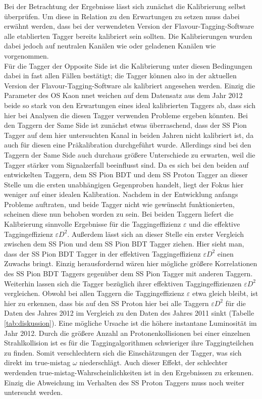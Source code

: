 Bei der Betrachtung der Ergebnisse lässt sich zunächst die Kalibrierung selbst überprüfen. Um diese in Relation zu den Erwartungen zu setzen muss dabei erwähnt werden, dass bei der verwendeten Version der Flavour-Tagging-Software alle etablierten Tagger bereits kalibriert sein sollten. Die Kalibrierungen wurden dabei jedoch auf neutralen Kanälen wie \BdToJPsiKst oder geladenen Kanälen wie \BuToJPsiKp vorgenommen.\\
Für die Tagger der Opposite Side ist die Kalibrierung unter diesen Bedingungen dabei in fast allen Fällen bestätigt; die Tagger können also in der aktuellen Version der Flavour-Tagging-Software als kalibriert angesehen werden. Einzig die Parameter des OS Kaon nnet weichen auf dem Datensatz aus dem Jahr \num{2012} beide so stark von den Erwartungen eines ideal kalibrierten Taggers ab, dass sich hier bei Analysen die diesen Tagger verwenden Probleme ergeben könnten. Bei den Taggern der Same Side ist zunächst etwas überraschend, dass der SS Pion Tagger auf dem hier untersuchten Kanal in beiden Jahren nicht kalibriert ist, da auch für diesen eine Präkalibration durchgeführt wurde. Allerdings sind bei den Taggern der Same Side auch durchaus größere Unterschiede zu erwarten, weil die Tagger stärker vom Signalzerfall beeinflusst sind. Da es sich bei den beiden auf \BdToDpi entwickelten Taggern, dem SS Pion BDT und dem SS Proton Tagger an dieser Stelle um die ersten unabhängigen Gegenproben handelt, liegt der Fokus hier weniger auf einer idealen Kalibration. Nachdem in der Entwicklung anfangs Probleme auftraten, und beide Tagger nicht wie gewünscht funktionierten, scheinen diese nun behoben worden zu sein. Bei beiden Taggern liefert die Kalibrierung sinnvolle Ergebnisse für die Taggingeffizienz $\varepsilon$ und die effektive Taggingeffizienz $\varepsilon D^2$. Außerdem lässt sich an dieser Stelle ein erster Vergleich zwischen dem SS Pion und dem SS Pion BDT Tagger ziehen. Hier sieht man, dass der SS Pion BDT Tagger in der effektiven Taggingeffizienz $\varepsilon D^2$ einen Zuwachs bringt. Einzig herausfordernd wären hier mögliche größere Korrelationen des SS Pion BDT Taggers gegenüber dem SS Pion Tagger mit anderen Taggern.\\
Weiterhin lassen sich die Tagger bezüglich ihrer effektiven Taggingeffizienzen $\varepsilon D^2$ vergleichen. Obwohl bei allen Taggern die Taggingeffizienz $\varepsilon$ etwa gleich bleibt, ist hier zu erkennen, dass bis auf den SS Proton hier bei alle Taggern  $\varepsilon D^2$ für die Daten des Jahres \num{2012} im Vergleich zu den Daten des Jahres \num{2011} sinkt (Tabelle \ref{tab:diskussion}). Eine mögliche Ursache ist die höhere instantane Luminosität im Jahr \num{2012}. Durch die größere Anzahl an Protonenkollisionen bei einer einzelnen Strahlkollision ist es für die Taggingalgorithmen schwieriger ihre Taggingteilchen zu finden. Somit verschlechtern sich die Einschätzungen der Tagger, was sich direkt im true-mistag $\omega$ niederschlägt. Auch dieser Effekt, der schlechter werdenden true-mistag-Wahrscheinlichkeiten ist in den Ergebnissen zu erkennen. Einzig die Abweichung im Verhalten des SS Proton Taggers muss noch weiter untersucht werden.
